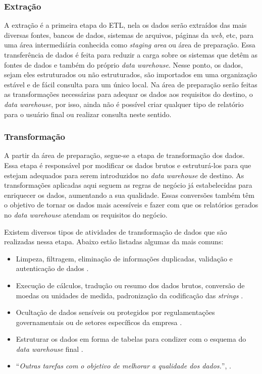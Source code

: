 \subsubsection{Extração}
\label{subsec:extracao}
A extração é a primeira etapa do ETL, nela os dados serão extraídos das mais diversas fontes, bancos de dados, sistemas de arquivos, páginas da \textit{web}, etc, para uma área intermediária conhecida como \textit{staging area} ou área de preparação. Essa transferência de dados é feita para reduzir a carga sobre os sistemas que detêm as fontes de dados e também do próprio \textit{data warehouse}. Nesse ponto, os dados, sejam eles estruturados ou não estruturados, são importados em uma organização estável e de fácil consulta para um único local. Na área de preparação serão feitas as transformações necessárias para adequar os dados aos requisitos do destino, o \textit{data warehouse}, por isso, ainda não é possível criar qualquer tipo de relatório para o usuário final ou  realizar consulta neste sentido.

\subsubsection{Transformação}
\label{subsec:transformacao}
A partir da área de preparação, segue-se a etapa de transformação dos dados. Essa etapa é responsável por modificar os dados brutos e estruturá-los para que estejam adequados para serem introduzidos no \textit{data warehouse} de destino. As transformações aplicadas aqui seguem as regras de negócio já estabelecidas para enriquecer os dados, aumentando a sua qualidade. Essas conversões também têm o objetivo de tornar os dados mais acessíveis e fazer com que os relatórios gerados no \textit{data warehouse} atendam os requisitos do negócio.

Existem diversos tipos de atividades de transformação de dados que são realizadas nessa etapa. Abaixo estão listadas algumas da mais comuns:

\begin{itemize}
  \item Limpeza, filtragem, eliminação de informações duplicadas, validação e autenticação de dados \cite{vida2021datawarehouse}.
  \item Execução de cálculos, tradução ou resumo dos dados brutos, conversão de moedas ou unidades de medida, padronização da codificação das \textit{strings} \cite{vida2021datawarehouse}.
  \item Ocultação de dados sensíveis ou protegidos por regulamentações governamentais ou de setores específicos da empresa \cite{vida2021datawarehouse}.
  \item Estruturar os dados em forma de tabelas para condizer com o esquema do \textit{data warehouse} final \cite{vida2021datawarehouse}.
  \item \enquote{\textit{Outras tarefas com o objetivo de melhorar a qualidade dos dados.}}, \cite{vida2021datawarehouse}.
\end{itemize} 

